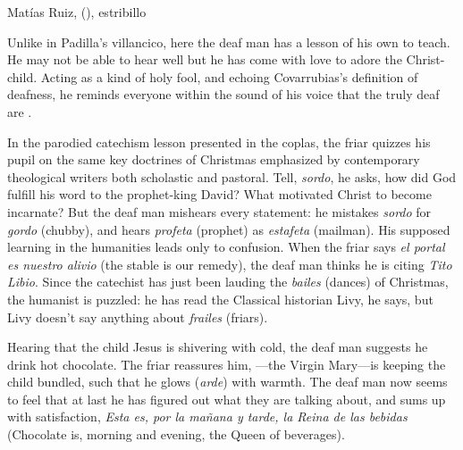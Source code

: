 {Matías Ruiz, 
(), estribillo} 

Unlike in Padilla's villancico, here the deaf man has a lesson of his own to
teach.
He may not be able to hear well but he has come with love to adore the
Christ-child.
Acting as a kind of holy fool, and echoing Covarrubias's definition of deafness,
he reminds everyone within the sound of his voice that the truly deaf are
.

In the parodied catechism lesson presented in the coplas, the friar quizzes his
pupil on the same key doctrines of Christmas emphasized by contemporary
theological writers both scholastic and pastoral.%
    \Autocite[]{Cashner:PhD} %
Tell, \emph{sordo}, he asks, how did God fulfill his word to the prophet-king
David?  
What motivated Christ to become incarnate? 
But the deaf man mishears every statement: he mistakes \emph{sordo} for
\emph{gordo} (chubby), and hears \emph{profeta} (prophet) as \emph{estafeta}
(mailman).
His supposed learning in the humanities leads only to confusion.
When the friar says \emph{el portal es nuestro alivio} (the stable is our
remedy), the deaf man thinks he is citing \emph{Tito Libio}.
Since the catechist has just been lauding the \emph{bailes} (dances) of
Christmas, the humanist is puzzled: he has read the Classical historian Livy, he
says, but Livy doesn't say anything about \emph{frailes} (friars).

Hearing that the child Jesus is shivering with cold, the deaf man suggests he
drink hot chocolate.
The friar reassures him, ---the Virgin Mary---is keeping the
child bundled, such that he glows (\emph{arde}) with warmth.
The deaf man now seems to feel that at last he has figured out what they are
talking about, and sums up with satisfaction, \emph{Esta es, por la mañana y
tarde, la Reina de las bebidas} (Chocolate is, morning and evening, the Queen of
beverages).

